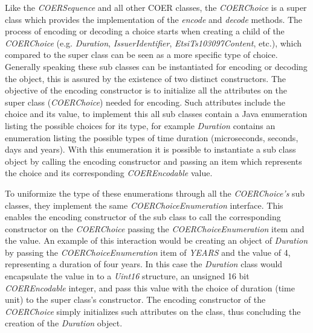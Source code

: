 Like the \textit{COERSequence} and all other COER classes, the \textit{COERChoice} is a super class which provides the implementation of the \textit{encode} and \textit{decode} methods. The process of encoding or decoding a choice starts when creating a child of the \textit{COERChoice} (e.g. \textit{Duration}, \textit{IssuerIdentifier}, \textit{EtsiTs103097Content}, etc.), which compared to the super class can be seen as a more specific type of choice. Generally speaking these sub classes can be instantiated for encoding or decoding the object, this is assured by the existence of two distinct constructors. The objective of the encoding constructor is to initialize all the attributes on the super class (\textit{COERChoice}) needed for encoding. Such attributes include the choice and its value, to implement this all sub classes contain a Java enumeration listing the possible choices for its type, for example \textit{Duration} contains an enumeration listing the possible types of time duration (microseconds, seconds, days and years). With this enumeration it is possible to instantiate a sub class object by calling the encoding constructor and passing an item which represents the choice and its corresponding \textit{COEREncodable} value. 

To uniformize the type of these enumerations through all the \textit{COERChoice's} sub classes, they implement the same \textit{COERChoiceEnumeration} interface. This enables the encoding constructor of the sub class to call the corresponding constructor on the \textit{COERChoice} passing the \textit{COERChoiceEnumeration} item and the value. An example of this interaction would be creating an object of \textit{Duration} by passing the \textit{COERChoiceEnumeration} item of \textit{YEARS} and the value of 4, representing a duration of four years. In this case the \textit{Duration} class would encapsulate the value in to a \textit{Uint16} structure, an unsigned 16 bit \textit{COEREncodable} integer, and pass this value with the choice of duration (time unit) to the super class's constructor. The encoding constructor of the \textit{COERChoice} simply initializes such attributes on the class, thus concluding the creation of the \textit{Duration} object. 

